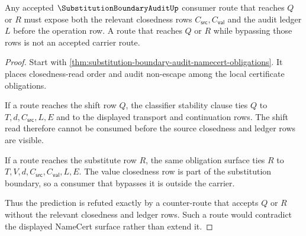 \begin{theorem}
\label{thm:substitution-boundary-audit-falsifiable-route}
Any accepted $\SubstitutionBoundaryAuditUp$ consumer route that reaches $Q$ or $R$ must expose both the relevant closedness rows $C_{\mathsf{src}},C_{\mathsf{val}}$ and the audit ledger $L$ before the operation row. A route that reaches $Q$ or $R$ while bypassing those rows is not an accepted carrier route.
\end{theorem}
\begin{proof}
Start with \autoref{thm:substitution-boundary-audit-namecert-obligations}. It places closedness-read order and audit non-escape among the local certificate obligations.

If a route reaches the shift row $Q$, the classifier stability clause ties $Q$ to $T,d,C_{\mathsf{src}},L,E$ and to the displayed transport and continuation rows. The shift read therefore cannot be consumed before the source closedness and ledger rows are visible.

If a route reaches the substitute row $R$, the same obligation surface ties $R$ to $T,V,d,C_{\mathsf{src}},C_{\mathsf{val}},L,E$. The value closedness row is part of the substitution boundary, so a consumer that bypasses it is outside the carrier.

Thus the prediction is refuted exactly by a counter-route that accepts $Q$ or $R$ without the relevant closedness and ledger rows. Such a route would contradict the displayed NameCert surface rather than extend it.
\end{proof}

